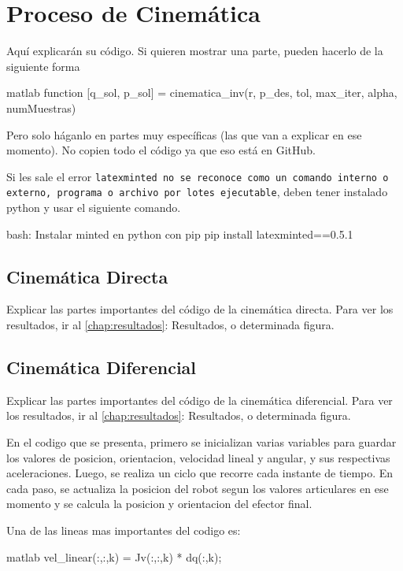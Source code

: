 \section{Proceso de Cinemática} \label{sec:proceso_cinematica}

Aquí explicarán su código. Si quieren mostrar una parte, pueden hacerlo de la siguiente forma

\begin{matlabcode}{matlab}
	function [q_sol, p_sol] = cinematica_inv(r, p_des, tol, max_iter, alpha, numMuestras)
\end{matlabcode}

Pero solo háganlo en partes muy específicas (las que van a explicar en ese momento). No copien todo el código ya que eso está en GitHub.

Si les sale el error \texttt{latexminted no se reconoce como un comando interno o externo, programa o archivo por lotes ejecutable}, deben tener instalado python y usar el siguiente comando.
\begin{terminal}{bash: Instalar minted en python con pip}
	pip install latexminted==0.5.1
\end{terminal}

\subsection{Cinemática Directa}
Explicar las partes importantes del código de la cinemática directa.
Para ver los resultados, ir al \autoref{chap:resultados}: Resultados, o determinada figura.
\subsection{Cinemática Diferencial}
Explicar las partes importantes del código de la cinemática diferencial.
Para ver los resultados, ir al \autoref{chap:resultados}: Resultados, o determinada figura.

En el codigo que se presenta, primero se inicializan varias variables para guardar los valores de posicion, orientacion, velocidad lineal y angular, y sus respectivas aceleraciones. Luego, se realiza un ciclo que recorre cada instante de tiempo. En cada paso, se actualiza la posicion del robot segun los valores articulares en ese momento y se calcula la posicion y orientacion del efector final.

Una de las lineas mas importantes del codigo es:
\begin{matlabcode}{matlab}
	vel_linear(:,:,k) = Jv(:,:,k) * dq(:,k);
\end{matlabcode}

